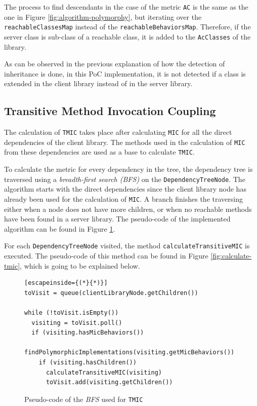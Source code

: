 The process to find descendants in the case of the metric \texttt{AC} is the same as the one in Figure \ref{fig:algorithm-polymorphy}, but iterating over the \texttt{reachableClassesMap} instead of the \texttt{reachableBehaviorsMap}. Therefore, if the server class is sub-class of a reachable class, it is added to the \texttt{AcClasses} of the library.

\blankl
As can be observed in the previous explanation of how the detection of inheritance is done, in this PoC implementation, it is not detected if a class is extended in the client library instead of in the server library.

\subsection{Transitive Method Invocation Coupling}\label{subsec:tmic}
The calculation of \texttt{TMIC} takes place after calculating \texttt{MIC} for all the direct dependencies of the client library. The methods used in the calculation of \texttt{MIC} from these dependencies are used as a base to calculate \texttt{TMIC}.

To calculate the metric for every dependency in the tree, the dependency tree is traversed using a \textit{breadth-first search (BFS)} on the \texttt{DependencyTreeNode}. The algorithm starts with the direct dependencies since the client library node has already been used for the calculation of \texttt{MIC}. A branch finishes the traversing either when a node does not have more children, or when no reachable methods have been found in a server library. The pseudo-code of the implemented algorithm can be found in Figure \ref{fig:tree-traversing-tmic}.

For each \texttt{DependencyTreeNode} visited, the method \texttt{calculateTransitiveMIC} is executed. The pseudo-code of this method can be found in Figure \ref{fig:calculate-tmic}, which is going to be explained below.

\begin{figure}[ht!]
\begin{lstlisting}[escapeinside={(*}{*)}]
toVisit = queue(clientLibraryNode.getChildren())

while (!toVisit.isEmpty())
  visiting = toVisit.poll()
  if (visiting.hasMicBehaviors())
    findPolymorphicImplementations(visiting.getMicBehaviors())
    if (visiting.hasChildren())
      calculateTransitiveMIC(visiting)
      toVisit.add(visiting.getChildren())
\end{lstlisting}
\caption{Pseudo-code of the \textit{BFS} used for \texttt{TMIC}}
\label{fig:tree-traversing-tmic}
\end{figure}

